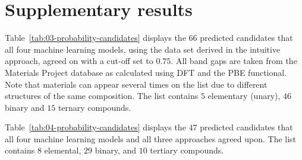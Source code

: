 \documentclass[superscriptaddress,unsortedaddress,
 amsmath,amssymb,
 aps,
]{revtex4-2}
\begin{document}
\section*{Supplementary results}
Table~\ref{tab:03-probability-candidates} displays the 66 predicted candidates that all four machine learning models, using the data set derived in the intuitive approach, agreed on with a cut-off set to $0.75$. All band gaps are taken from the Materials Project database as calculated using DFT and the PBE functional. Note that materials can appear several times  on  the  list due  to  different  structures of the same composition. The  list  contains $5$ elementary (unary), $46$  binary and  $15$ ternary compounds. 



Table~\ref{tab:04-probability-candidates} displays the $47$ predicted candidates that all four machine learning models and all three approaches agreed upon. The list contains $8$ elemental, $29$ binary, and $10$ tertiary compounds.




\end{document}
